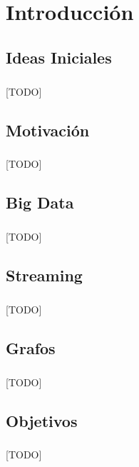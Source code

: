 \documentclass{subfiles}
\begin{document}
  \chapter{Introducción}
  \label{chap:intro}

    \section{Ideas Iniciales}
    \label{sec:introduction_initial_ideas}

      \paragraph{}
      [TODO]

    \section{Motivación}
    \label{sec:introduction_motivation}

      \paragraph{}
      [TODO]

    \section{Big Data}
    \label{sec:introduction_big_data}

      \paragraph{}
      [TODO]

    \section{Streaming}
    \label{sec:introduction_streaming}

      \paragraph{}
      [TODO]

    \section{Grafos}
    \label{sec:introduction_graphs}

      \paragraph{}
      [TODO]

    \section{Objetivos}
    \label{sec:introduction_goals}

      \paragraph{}
      [TODO]
\end{document}
